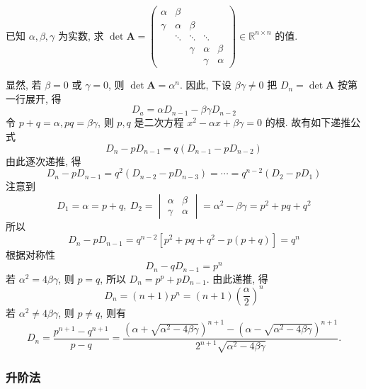 \begin{example}[2006 中国科学院]
    已知 $\alpha,\beta,\gamma$ 为实数, 求
    $\det\boldsymbol{A}=\begin{pmatrix}
            \alpha & \beta  &        &        &        \\
            \gamma & \alpha & \beta  &        &        \\
                   & \ddots & \ddots & \ddots &        \\
                   &        & \gamma & \alpha & \beta  \\
                   &        &        & \gamma & \alpha
        \end{pmatrix}\in \mathbb{R}^{n\times n}$ 的值.
\end{example}
\begin{solution}
    显然, 若 $\beta=0$ 或 $\gamma=0$, 则 $\det\boldsymbol{A}=\alpha^n$. 因此, 下设 $\beta\gamma\not=0$
    把 $D_n=\det\boldsymbol{A}$ 按第一行展开, 得 $$D_a=\alpha D_{n-1}-\beta\gamma D_{n-2}$$
    令 $p+q=\alpha,pq=\beta\gamma$, 则 $p,q$ 是二次方程 $x^2-\alpha x+\beta\gamma=0$ 的根. 故有如下递推公式
    $$D_n-pD_{n-1}=q(D_{n-1}-pD_{n-2})$$
    由此逐次递推, 得 $$D_n-pD_{n-1}=q^2(D_{n-2}-pD_{n-3})=\cdots=q^{n-2}(D_2-pD_1)$$
    注意到 $$D_1=\alpha=p+q,~D_2=\begin{vmatrix}
            \alpha & \beta  \\
            \gamma & \alpha
        \end{vmatrix}=\alpha^2-\beta\gamma=p^2+pq+q^2$$
    所以 $$D_n-pD_{n-1}=q^{n-2}[p^2+pq+q^2-p(p+q)]=q^n$$
    根据对称性 $$D_n-qD_{n-1}=p^n$$
    若 $\alpha^2=4\beta\gamma$, 则 $p=q$, 所以 $D_n=p^p+pD_{n-1}$. 由此递推, 得
    $$D_n=(n+1)p^n=(n+1)\left(\frac{\alpha}{2}\right)^n$$
    若 $\alpha^2\not=4\beta\gamma$, 则 $p\not=q$, 则有
    $$D_n=\frac{p^{n+1}-q^{n+1}}{p-q}=\frac{\left(\alpha+\sqrt{\alpha^2-4\beta\gamma}\right)^{n+1}-\left(\alpha-\sqrt{\alpha^2-4\beta\gamma}\right)^{n+1}}{2^{n+1}\sqrt{\alpha^2-4\beta\gamma}}.$$
\end{solution}

\subsubsection{升阶法}

